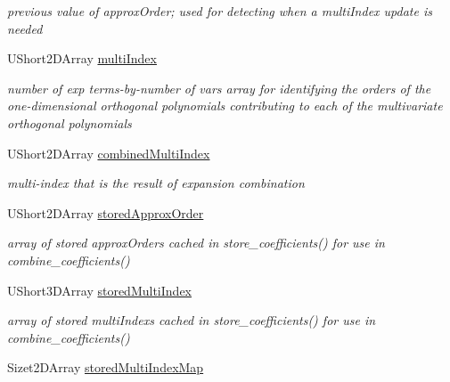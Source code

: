 \begin{DoxyCompactItemize}
\begin{DoxyCompactList}\small\item\em previous value of approx\+Order; used for detecting when a multi\+Index update is needed \end{DoxyCompactList}\item 
U\+Short2\+D\+Array \hyperlink{classPecos_1_1SharedOrthogPolyApproxData_a0fbdd5817bc6dd026f6d42269ca8e703}{multi\+Index}\label{classPecos_1_1SharedOrthogPolyApproxData_a0fbdd5817bc6dd026f6d42269ca8e703}

\begin{DoxyCompactList}\small\item\em number of exp terms-\/by-\/number of vars array for identifying the orders of the one-\/dimensional orthogonal polynomials contributing to each of the multivariate orthogonal polynomials \end{DoxyCompactList}\item 
U\+Short2\+D\+Array \hyperlink{classPecos_1_1SharedOrthogPolyApproxData_aadaab08e6fa9077251a246bfbbbf7c62}{combined\+Multi\+Index}\label{classPecos_1_1SharedOrthogPolyApproxData_aadaab08e6fa9077251a246bfbbbf7c62}

\begin{DoxyCompactList}\small\item\em multi-\/index that is the result of expansion combination \end{DoxyCompactList}\item 
U\+Short2\+D\+Array \hyperlink{classPecos_1_1SharedOrthogPolyApproxData_a8d60d6cbbbaccb054fbef719fc888541}{stored\+Approx\+Order}\label{classPecos_1_1SharedOrthogPolyApproxData_a8d60d6cbbbaccb054fbef719fc888541}

\begin{DoxyCompactList}\small\item\em array of stored approx\+Order\textquotesingle{}s cached in store\+\_\+coefficients() for use in combine\+\_\+coefficients() \end{DoxyCompactList}\item 
U\+Short3\+D\+Array \hyperlink{classPecos_1_1SharedOrthogPolyApproxData_a626cd89b67ee81f1dc1fc0f3eaf094d2}{stored\+Multi\+Index}\label{classPecos_1_1SharedOrthogPolyApproxData_a626cd89b67ee81f1dc1fc0f3eaf094d2}

\begin{DoxyCompactList}\small\item\em array of stored multi\+Index\textquotesingle{}s cached in store\+\_\+coefficients() for use in combine\+\_\+coefficients() \end{DoxyCompactList}\item 
Sizet2\+D\+Array \hyperlink{classPecos_1_1SharedOrthogPolyApproxData_ad37f78c9e690a8ef5543619add66d951}{stored\+Multi\+Index\+Map}\label{classPecos_1_1SharedOrthogPolyApproxData_ad37f78c9e690a8ef5543619add66d951}


\end{DoxyCompactItemize}
